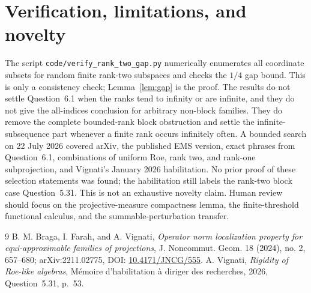 \documentclass[11pt]{article}
\begin{document}
\section{Verification, limitations, and novelty}
The script \texttt{code/verify\_rank\_two\_gap.py} numerically enumerates
all coordinate subsets for random finite rank-two subspaces and checks the
$1/4$ gap bound. This is only a consistency check; Lemma~\ref{lem:gap} is
the proof.
The results do not settle Question~6.1 when the ranks tend to infinity or
are infinite, and they do not give the all-indices conclusion for arbitrary
non-block families.  They do remove the complete bounded-rank block
obstruction and settle the infinite-subsequence part whenever a finite rank
occurs infinitely often.
A bounded search on 22 July 2026 covered arXiv, the published EMS version,
exact phrases from Question~6.1, combinations of uniform Roe, rank two, and
rank-one subprojection, and Vignati's January 2026 habilitation. No prior proof
of these selection statements was found; the habilitation still labels the
rank-two block case Question~5.31. This is not an exhaustive novelty claim.
Human review should focus on the projective-measure compactness lemma, the
finite-threshold functional calculus, and the summable-perturbation transfer.
\begin{thebibliography}{9}
B. M. Braga, I. Farah, and A. Vignati,
\emph{Operator norm localization property for equi-approximable families
of projections}, J. Noncommut. Geom. 18 (2024), no. 2, 657--680;
arXiv:2211.02775, DOI:
\href{https://doi.org/10.4171/JNCG/555}{10.4171/JNCG/555}.
A. Vignati, \emph{Rigidity of Roe-like algebras},
M\'emoire d'habilitation \`a diriger des recherches, 2026,
Question~5.31, p.~53.
\end{thebibliography}
\end{document}

